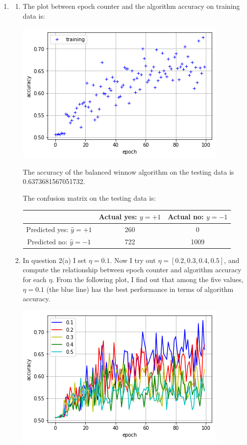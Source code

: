 \documentclass[paper=letter, fontsize=12pt]{article}
\begin{document}
\begin{enumerate}
\item 
\begin{enumerate}
	\item 
	The plot between epoch counter and the algorithm accuracy on training data is:
	
	\includegraphics[scale=0.5]{p2q2a.png}
	
	The accuracy of the balanced winnow algorithm on the testing data is 0.6373681567051732.
	
	The confusion matrix on the testing data is:
	
	\begin{tabular} {|c|c|c|}
		\hline
		& Actual yes: $y = +1$ & Actual no: $y = -1$	\\ \hline
		Predicted yes: $\hat{y} = +1$& 260 & 0 \\ \hline
		Predicted no: $\hat{y} = -1$ & 722 & 1009 \\ \hline
	\end{tabular}

	\item 
	In question 2(a) I set $\eta = 0.1$. Now I try out $\eta = [0.2, 0.3, 0.4, 0.5]$, and compute the relationship between epoch counter and algorithm accuracy for each $\eta$. From the following plot, I find out that among the five values, $\eta = 0.1$ (the blue line) has the best performance in terms of algorithm accuracy.
	
	\includegraphics[scale=0.5]{p2q2b1.png}
	

\end{enumerate}
\end{enumerate}
\end{document}
